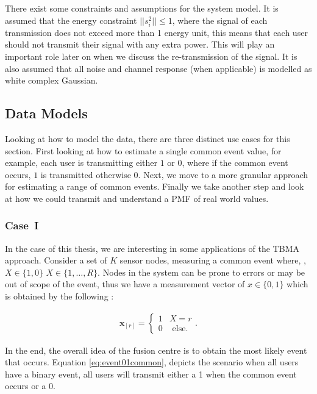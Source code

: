 \documentclass{article}
\begin{document}
There exist some constraints and assumptions for the system model. It is assumed that the energy constraint $||s_{i}^2|| \leq 1$, where the signal of each transmission does not exceed more than 1 energy unit, this means that each user should not transmit their signal with any extra power. This will play an important role later on when we discuss the re-transmission of the signal. It is also assumed that all noise and channel response (when applicable) is modelled as white complex Gaussian.   

\subsection{Data Models}\label{data_models}

Looking at how to model the data, there are three distinct use cases for this section. First looking at how to estimate a single common event value, for example, each user is transmitting either $1$ or $0$, where if the common event occurs, $1$ is transmitted otherwise 0. Next, we move to a more granular approach for estimating a range of common events. Finally we take another step and look at how we could transmit and understand a PMF of real world values. 
\subsubsection{Case~I}

In the case of this thesis, we are interesting in some applications of the TBMA approach. Consider a set of $K$ sensor nodes, measuring a common event where, ,${X \in \{1, 0\}}$ ${X \in \{1, \ldots, R\}}$. Nodes in the system can be prone to errors or may be out of scope of the event, thus we have a measurement vector of ${x \in \{0, 1\}}$ which is obtained by the following :

\begin{align}
    \boldsymbol{x}_{[r]} 
    = 
    \begin{cases}
        1 & X = r
        \\[2ex]
        0 & \text{ else}.
    \end{cases}
    . \label{eq:event01common}
\end{align}

In the end, the overall idea of the fusion centre is to obtain the most likely event that occurs. Equation \ref{eq:event01common}, depicts the scenario when all users have a binary event, all users will transmit either a 1 when the common event occurs or a 0. 
\end{document}
